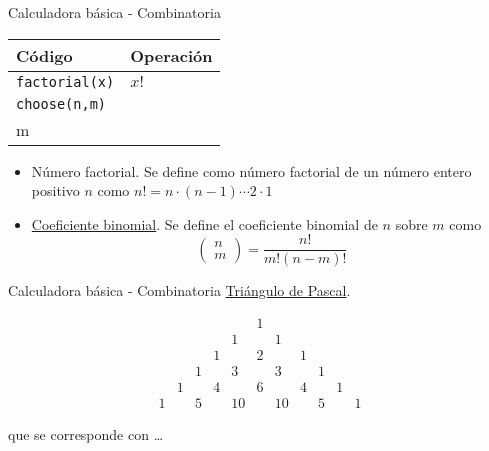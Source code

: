 \documentclass[
  ignorenonframetext,
]{beamer}
\providecommand{\tightlist}{%
  \setlength{\itemsep}{0pt}\setlength{\parskip}{0pt}}
\begin{document}
\begin{frame}[fragile]{Calculadora básica - Combinatoria}
\protect\hypertarget{calculadora-buxe1sica---combinatoria}{}
\begin{longtable}[]{@{}ll@{}}
\toprule
Código & Operación \\
\midrule
\endhead
\texttt{factorial(x)} &
\href{https://es.wikipedia.org/wiki/Factorial}{\(x!\)} \\
\texttt{choose(n,m)} & \(\begin{pmatrix}n\\ m\end{pmatrix}\) \\
\bottomrule
\end{longtable}

\vspace{0.2cm}

\begin{itemize}
\tightlist
\item
  Número factorial. Se define como número factorial de un número entero
  positivo \(n\) como \(n!=n\cdot(n-1)\cdots 2\cdot 1\)
\item
  \href{https://es.wikipedia.org/wiki/Coeficiente_binomial}{Coeficiente
  binomial}. Se define el coeficiente binomial de \(n\) sobre \(m\) como
  \[\begin{pmatrix}n\\ m\end{pmatrix}=\frac{n!}{m!(n-m)!}\]
\end{itemize}
\end{frame}

\begin{frame}{Calculadora básica - Combinatoria}
\protect\hypertarget{calculadora-buxe1sica---combinatoria-1}{}
\href{https://es.wikipedia.org/wiki/Triángulo_de_Pascal}{Triángulo de
Pascal}.

\usepackage{mathdots}
\usepackage{yhmath}
\usepackage{mathdots}
\usepackage{MnSymbol}

\[\begin{matrix}
&&&&&1&&&&&\\
&&&&1&&1&&&&\\
&&&1&&2&&1&&&\\
&&1&&3&&3&&1&&\\
&1&&4&&6&&4&&1&\\
1&&5&&10&&10&&5&&1\end{matrix}\]

que se corresponde con \ldots{}
\end{frame}
\end{document}
